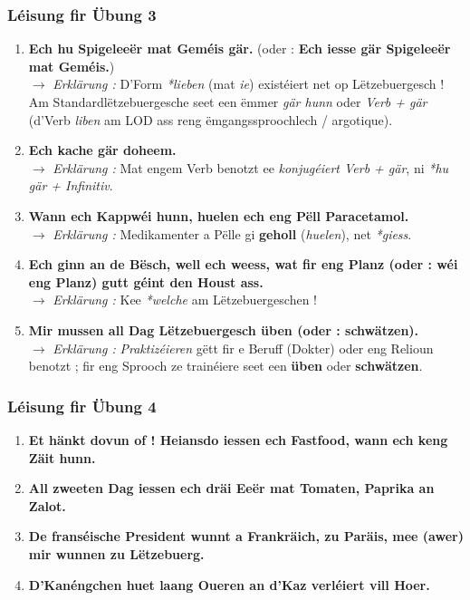 \subsubsection*{Léisung fir Übung 3}
\begin{enumerate}
    \item \textbf{Ech hu Spigeleeër mat Geméis gär.} (oder : \textbf{Ech iesse gär Spigeleeër mat Geméis.}) \\
    $\rightarrow$ \textit{Erklärung :} D'Form \textit{*lieben} (mat \textit{ie}) existéiert net op Lëtzebuergesch ! Am Standardlëtzebuergesche seet een ëmmer \textit{gär hunn} oder \textit{Verb + gär} (d'Verb \textit{liben} am LOD ass reng ëmgangssproochlech / argotique).
    \item \textbf{Ech kache gär doheem.} \\
    $\rightarrow$ \textit{Erklärung :} Mat engem Verb benotzt ee \textit{konjugéiert Verb + gär}, ni \textit{*hu gär + Infinitiv}.
    \item \textbf{Wann ech Kappwéi hunn, huelen ech eng Pëll Paracetamol.} \\
    $\rightarrow$ \textit{Erklärung :} Medikamenter a Pëlle gi \textbf{geholl} (\textit{huelen}), net \textit{*giess}.
    \item \textbf{Ech ginn an de Bësch, well ech weess, wat fir eng Planz (oder : wéi eng Planz) gutt géint den Houst ass.} \\
    $\rightarrow$ \textit{Erklärung :} Kee \textit{*welche} am Lëtzebuergeschen !
    \item \textbf{Mir mussen all Dag Lëtzebuergesch üben (oder : schwätzen).} \\
    $\rightarrow$ \textit{Erklärung :} \textit{Praktizéieren} gëtt fir e Beruff (Dokter) oder eng Relioun benotzt ; fir eng Sprooch ze trainéiere seet een \textbf{üben} oder \textbf{schwätzen}.
\end{enumerate}

\subsubsection*{Léisung fir Übung 4}
\begin{enumerate}
    \item \textbf{Et hänkt dovun of ! Heiansdo iessen ech Fastfood, wann ech keng Zäit hunn.}
    \item \textbf{All zweeten Dag iessen ech dräi Eeër mat Tomaten, Paprika an Zalot.}
    \item \textbf{De franséische President wunnt a Frankräich, zu Paräis, mee (awer) mir wunnen zu Lëtzebuerg.}
    \item \textbf{D'Kanéngchen huet laang Oueren an d'Kaz verléiert vill Hoer.}
\end{enumerate}

